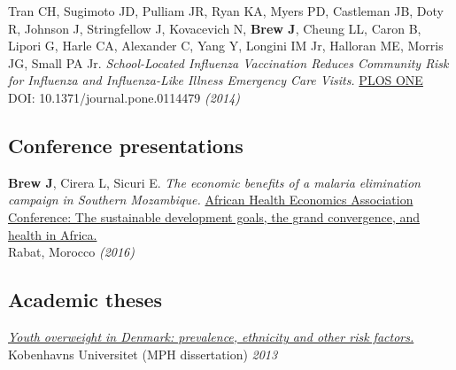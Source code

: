 \documentclass[11pt]{article}
\begin{document}
\noindent Tran CH, Sugimoto JD, Pulliam JR, Ryan KA, Myers PD, Castleman JB, Doty R, Johnson J, Stringfellow J, Kovacevich N, \textbf{Brew J}, Cheung LL, Caron B, Lipori G, Harle CA, Alexander C, Yang Y, Longini IM Jr, Halloran ME, Morris JG, Small PA Jr. \emph{School-Located Influenza Vaccination Reduces Community Risk for Influenza and Influenza-Like Illness Emergency Care Visits.} \href{http://journals.plos.org/plosone/article?id=10.1371/journal.pone.0114479}{PLOS ONE} \\
DOI: 10.1371/journal.pone.0114479 \hfill \emph{(2014)}\\

% 


\subsection*{Conference presentations}

\noindent \textbf{Brew J}, Cirera L, Sicuri E. \emph{The economic benefits of a malaria elimination campaign in Southern Mozambique.} \href{http://afhea.org/en/conferences/conference-2016-rabat}{African Health Economics Association Conference: The sustainable development goals, the grand convergence, and health in Africa.} \\
Rabat, Morocco \hfill \emph{(2016)}\\



\subsection*{Academic theses}

\noindent \emph{\href{http://info.skolesundhed.dk/wp-content/uploads/2012/10/Speciale-af-Joseph-Brew.pdf}{Youth overweight in Denmark: prevalence, ethnicity and other risk factors.}} Kobenhavns Universitet (MPH dissertation) \hfill \emph{2013}\\
\end{document}
